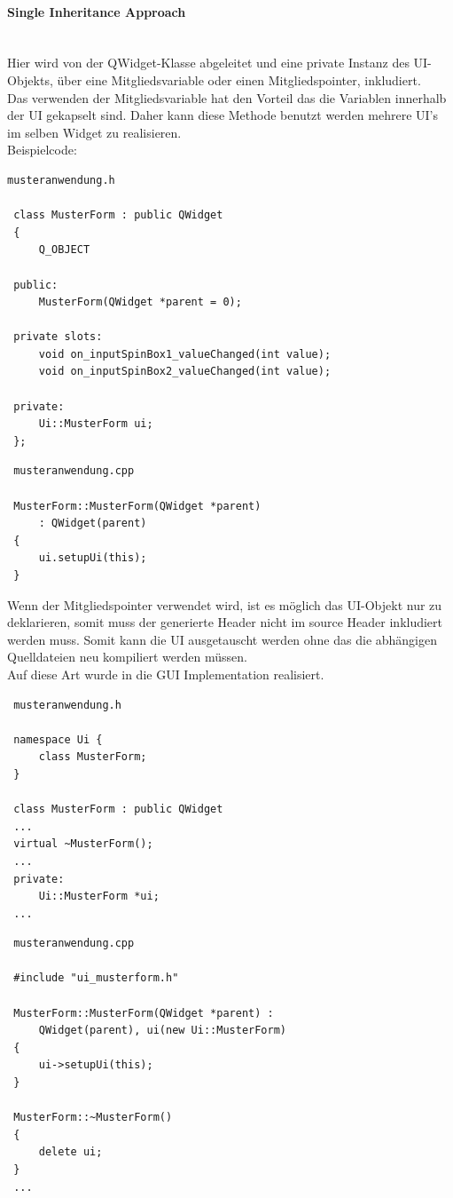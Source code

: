 \paragraph{Single Inheritance Approach}\mbox{}\\
Hier wird von der QWidget-Klasse abgeleitet und eine private Instanz des UI-Objekts, über eine Mitgliedsvariable oder einen Mitgliedspointer, inkludiert.\\
Das verwenden der Mitgliedsvariable hat den Vorteil das die Variablen innerhalb der UI gekapselt sind. Daher kann diese Methode benutzt werden mehrere UI’s im selben Widget zu realisieren.\\Beispielcode:
\begin{lstlisting}
musteranwendung.h

 class MusterForm : public QWidget
 {
     Q_OBJECT

 public:
     MusterForm(QWidget *parent = 0);

 private slots:
     void on_inputSpinBox1_valueChanged(int value);
     void on_inputSpinBox2_valueChanged(int value);

 private:
     Ui::MusterForm ui;
 };
\end{lstlisting}
\begin{lstlisting}
 musteranwendung.cpp

 MusterForm::MusterForm(QWidget *parent)
     : QWidget(parent)
 {
     ui.setupUi(this);
 }
\end{lstlisting}
\newpage
\noindent
Wenn der Mitgliedspointer verwendet wird, ist es möglich das UI-Objekt nur zu deklarieren, somit muss der generierte Header nicht im source Header inkludiert werden muss. Somit kann die UI ausgetauscht werden ohne das die abhängigen Quelldateien neu kompiliert werden müssen.\\ Auf diese Art wurde in \EBP die GUI Implementation realisiert. 
\begin{lstlisting}
 musteranwendung.h

 namespace Ui {
     class MusterForm;
 }

 class MusterForm : public QWidget
 ...
 virtual ~MusterForm();
 ...
 private:
     Ui::MusterForm *ui;
 ...
\end{lstlisting}
\begin{lstlisting}
 musteranwendung.cpp

 #include "ui_musterform.h"

 MusterForm::MusterForm(QWidget *parent) :
     QWidget(parent), ui(new Ui::MusterForm)
 {
     ui->setupUi(this);
 }

 MusterForm::~MusterForm()
 {
     delete ui;
 }
 ...
\end{lstlisting}
\newpage
